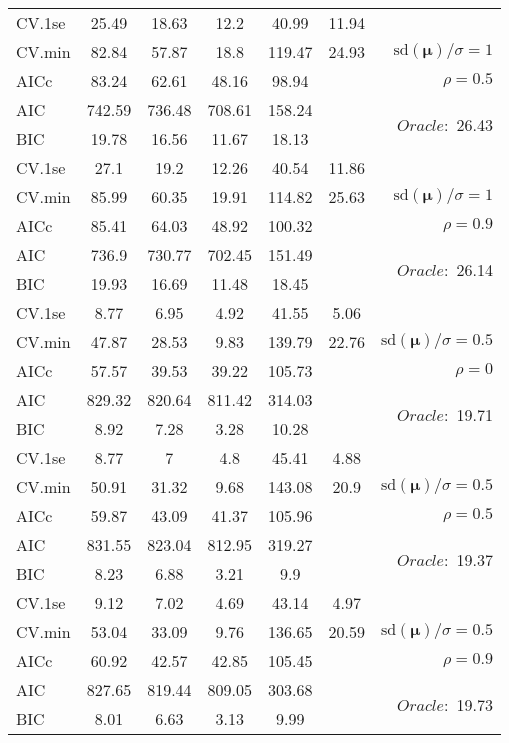 \begin{table}
\begin{center}
\begin{tabular}{l*{5}{c}|r}
 \hline 
CV.1se & 25.49 & 18.63 & 12.2 & 40.99 & 11.94 & \\
CV.min & 82.84 & 57.87 & 18.8 & 119.47 & 24.93 &  $\mathrm{sd}(\mathbf{\mu})/\sigma=1$ \\
AICc & 83.24 & 62.61 & 48.16 & 98.94 & & $\rho=0.5$ \\
AIC & 742.59 & 736.48 & 708.61 & 158.24 & &  \multirow{2}{*}{$Oracle: $ 26.43} \\
BIC & 19.78 & 16.56 & 11.67 & 18.13 & &  \\
 \hline 
CV.1se & 27.1 & 19.2 & 12.26 & 40.54 & 11.86 & \\
CV.min & 85.99 & 60.35 & 19.91 & 114.82 & 25.63 &  $\mathrm{sd}(\mathbf{\mu})/\sigma=1$ \\
AICc & 85.41 & 64.03 & 48.92 & 100.32 & & $\rho=0.9$ \\
AIC & 736.9 & 730.77 & 702.45 & 151.49 & &  \multirow{2}{*}{$Oracle: $ 26.14} \\
BIC & 19.93 & 16.69 & 11.48 & 18.45 & &  \\
 \hline 
CV.1se & 8.77 & 6.95 & 4.92 & 41.55 & 5.06 & \\
CV.min & 47.87 & 28.53 & 9.83 & 139.79 & 22.76 &  $\mathrm{sd}(\mathbf{\mu})/\sigma=0.5$ \\
AICc & 57.57 & 39.53 & 39.22 & 105.73 & & $\rho=0$ \\
AIC & 829.32 & 820.64 & 811.42 & 314.03 & &  \multirow{2}{*}{$Oracle: $ 19.71} \\
BIC & 8.92 & 7.28 & 3.28 & 10.28 & &  \\
 \hline 
CV.1se & 8.77 & 7 & 4.8 & 45.41 & 4.88 & \\
CV.min & 50.91 & 31.32 & 9.68 & 143.08 & 20.9 &  $\mathrm{sd}(\mathbf{\mu})/\sigma=0.5$ \\
AICc & 59.87 & 43.09 & 41.37 & 105.96 & & $\rho=0.5$ \\
AIC & 831.55 & 823.04 & 812.95 & 319.27 & &  \multirow{2}{*}{$Oracle: $ 19.37} \\
BIC & 8.23 & 6.88 & 3.21 & 9.9 & &  \\
 \hline 
CV.1se & 9.12 & 7.02 & 4.69 & 43.14 & 4.97 & \\
CV.min & 53.04 & 33.09 & 9.76 & 136.65 & 20.59 &  $\mathrm{sd}(\mathbf{\mu})/\sigma=0.5$ \\
AICc & 60.92 & 42.57 & 42.85 & 105.45 & & $\rho=0.9$ \\
AIC & 827.65 & 819.44 & 809.05 & 303.68 & &  \multirow{2}{*}{$Oracle: $ 19.73} \\
BIC & 8.01 & 6.63 & 3.13 & 9.99 & &  \\
 \hline 
\end{tabular}
\end{center}
\vspace{-1cm}
\end{table}





